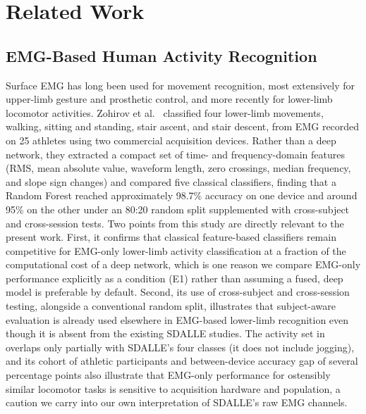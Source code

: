 \documentclass[conference]{IEEEtran}
\begin{document}
\section{Related Work}
\label{sec:related-work}

\subsection{EMG-Based Human Activity Recognition}
\label{subsec:emg-har}

Surface EMG has long been used for movement recognition, most
extensively for upper-limb gesture and prosthetic control, and more
recently for lower-limb locomotor activities. Zohirov et
al.~\cite{zohirov2025emglowerlimb} classified four lower-limb
movements, walking, sitting and standing, stair ascent, and stair
descent, from EMG recorded on 25 athletes using two commercial
acquisition devices. Rather than a deep network, they extracted a
compact set of time- and frequency-domain features (RMS, mean
absolute value, waveform length, zero crossings, median frequency,
and slope sign changes) and compared five classical classifiers,
finding that a Random Forest reached approximately 98.7\% accuracy
on one device and around 95\% on the other under an 80:20 random
split supplemented with cross-subject and cross-session tests. Two
points from this study are directly relevant to the present work.
First, it confirms that classical feature-based classifiers remain
competitive for EMG-only lower-limb activity classification at a
fraction of the computational cost of a deep network, which is one
reason we compare EMG-only performance explicitly as a condition
(E1) rather than assuming a fused, deep model is preferable by
default. Second, its use of cross-subject and cross-session testing,
alongside a conventional random split, illustrates that
subject-aware evaluation is already used elsewhere in EMG-based
lower-limb recognition even though it is absent from the existing
SDALLE studies. The activity set in \cite{zohirov2025emglowerlimb}
overlaps only partially with SDALLE's four classes (it does not
include jogging), and its cohort of athletic participants and
between-device accuracy gap of several percentage points also
illustrate that EMG-only performance for ostensibly similar
locomotor tasks is sensitive to acquisition hardware and population,
a caution we carry into our own interpretation of SDALLE's raw
EMG channels.
\end{document}
